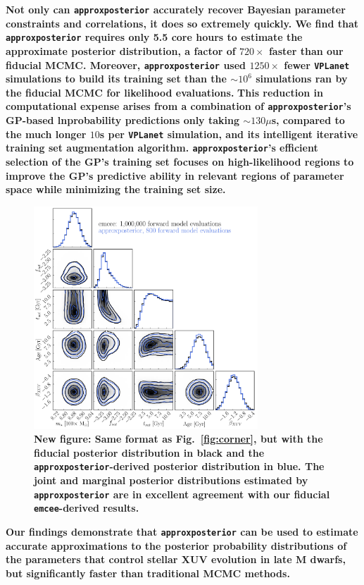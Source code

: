 \documentclass[twocolumn]{aastex62}
\newcommand{\xxx}[1]{{\textbf{#1}}}
\newcommand{\vplanet}[0]{\texttt{VPLanet}\xspace}
\newcommand{\emcee}[0]{\texttt{emcee}\xspace}
\newcommand{\approxposterior}[0]{\texttt{approxposterior}\xspace}
\begin{document}
\xxx{Not only can \approxposterior accurately recover Bayesian parameter constraints and correlations, it does so extremely quickly. We find that \approxposterior requires only 5.5 core hours to estimate the approximate posterior distribution, a factor of $720\times$ faster than our fiducial MCMC. Moreover, \approxposterior used $1250\times$ fewer \vplanet simulations to build its training set than the ${\sim}10^6$ simulations ran by the fiducial MCMC for likelihood evaluations.} \xxx{This reduction in computational expense arises from a combination of \approxposterior's GP-based lnprobability predictions only taking ${\sim}130\mu$s, compared to the much longer $10$s per \vplanet simulation, and its intelligent iterative training set augmentation algorithm. \approxposterior's efficient selection of the GP's training set focuses on high-likelihood regions to improve the GP's predictive ability in relevant regions of parameter space while minimizing the training set size.}

\begin{figure}[t]
\centering
	\includegraphics[width=0.75\textwidth]{../Analysis/Approx/stacked.pdf}
   \caption{\xxx{New figure: Same format as Fig.~\ref{fig:corner}, but with the fiducial posterior distribution in black and the \approxposterior-derived posterior distribution in blue. \textbf{The joint and marginal posterior distributions estimated by \approxposterior are in excellent agreement with our fiducial \emcee-derived results.}}}%
    \label{fig:stacked}%
\end{figure}

\xxx{Our findings demonstrate that \approxposterior can be used to estimate accurate approximations to the posterior probability distributions of the parameters that control stellar XUV evolution in late M dwarfs, but significantly faster than traditional MCMC methods.}
\end{document}

